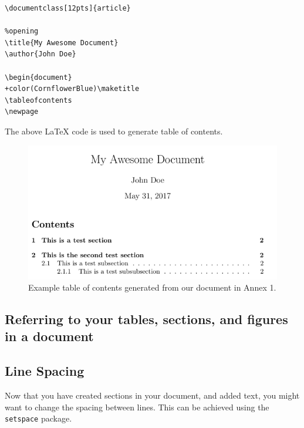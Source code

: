 \documentclass[12pts]{report}
\begin{document}
\begin{multicols}{2}
	
\begin{Verbatim}[commandchars=+\(\)]
\documentclass[12pts]{article}

%opening
\title{My Awesome Document}
\author{John Doe}

\begin{document}
+color(CornflowerBlue)\maketitle
\tableofcontents
\newpage

\end{Verbatim}
The above {\LaTeX} code is used to generate table of contents.

\columnbreak
\begin{figure} [H]
	\centering
	\includegraphics[width=1\linewidth]{../img/tableofcontents2}
	\caption{Example table of contents generated from our document in Annex 1.}
	\label{fig:tableofcontents}
\end{figure}
\end{multicols}

\subsection*{Referring to your tables, sections, and figures in a document}


\subsection*{Line Spacing}

Now that you have created sections in your document, and added text, you might want to change the spacing between lines. This can be achieved using the \texttt{setspace} package. 
\end{document}
